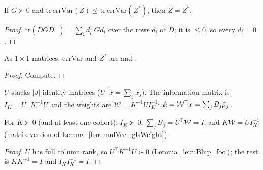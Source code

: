 \begin{theorem}\label{thm:VBM_unique}
  \leanok
  If $G \succ 0$ and $\mathrm{tr}\,\mathrm{errVar}(Z) \le \mathrm{tr}\,\mathrm{errVar}(Z^\ast)$,
  then $Z = Z^\ast$.
\end{theorem}
\begin{proof}
  \leanok
  $\mathrm{tr}(DGD^\top) = \sum_i d_i^\top G d_i$ over the rows $d_i$ of $D$;
  it is $\le 0$, so every $d_i = 0$.
\end{proof}

\begin{theorem}[The scalar blend is $P = 1$]\label{thm:VBM_scalar}
  \leanok
  As $1 \times 1$ matrices, $\mathrm{errVar}$ and $Z^\ast$ are  and .
\end{theorem}
\begin{proof}
  \leanok
  Compute.
\end{proof}

\begin{definition}\label{def:CV_glsW}
  \leanok
  $U$ stacks $|J|$ identity matrices ($U^\top x = \sum_j x_j$). The information
  matrix is $I_K = U^\top K^{-1} U$ and the weights are $\mathcal W = K^{-1}U I_K^{-1}$:
  $\hat\mu = \mathcal W^\top x = \sum_j B_j\hat\mu_j$.
\end{definition}

\begin{lemma}\label{lem:CV_glsW}
  \leanok
  For $K \succ 0$ (and at least one cohort): $I_K \succ 0$, $\sum_j B_j = U^\top\mathcal W = I$,
  and $K\mathcal W = U I_K^{-1}$ (matrix version of Lemma~\ref{lem:mulVec_glsWeight}).
\end{lemma}
\begin{proof}
  \leanok
  $U$ has full column rank, so $U^\top K^{-1} U \succ 0$ (Lemma~\ref{lem:Blup_foc}); the rest is
  $K K^{-1} = I$ and $I_K I_K^{-1} = I$.
\end{proof}

